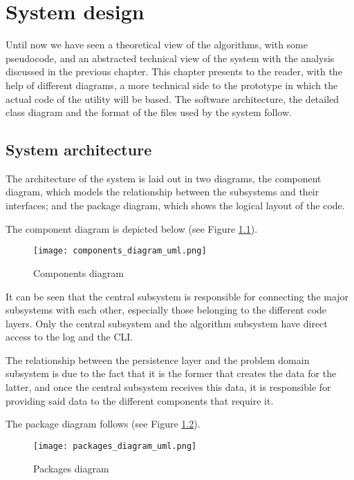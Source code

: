 \renewcommand{\documentname}{System design}

\chapter{System design}


Until now we have seen a theoretical view of the algorithms, with some pseudocode, and an abstracted technical view of the system with the analysis discussed in the previous chapter. This chapter presents to the reader, with the help of different diagrams, a more technical side to the prototype in which the actual code of the utility will be based. The software architecture, the detailed class diagram and the format of the files used by the system follow.


\section{System architecture}

The architecture of the system is laid out in two diagrams, the component diagram, which models the relationship between the subsystems and their interfaces; and the package diagram, which shows the logical layout of the code.

The component diagram is depicted below (see Figure \ref{compo-diagram}).


\begin{figure}[H]
    \caption{Components diagram}
    \label{compo-diagram}
  \centering
  \texttt{[image: components\_diagram\_uml.png]}
\end{figure}

It can be seen that the central subsystem is responsible for connecting the major subsystems with each other, especially those belonging to the different code layers. Only the central subsystem and the algorithm subsystem have direct access to the log and the CLI.

The relationship between the persistence layer and the problem domain subsystem is due to the fact that it is the former that creates the data for the latter, and once the central subsystem receives this data, it is responsible for providing said data to the different components that require it.

The package diagram follows (see Figure \ref{pack-diagram}).

\begin{figure}[H]
    \caption{Packages diagram}
    \label{pack-diagram}
  \centering
  \texttt{[image: packages\_diagram\_uml.png]}
\end{figure}

